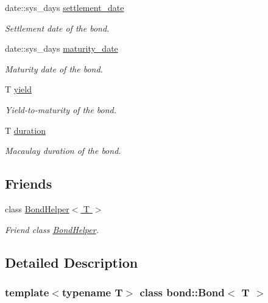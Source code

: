 \begin{DoxyCompactItemize}
date\+::sys\+\_\+days \hyperlink{classbond_1_1_bond_a2ead15c4c0cbda2cdecf6500b02442e7}{settlement\+\_\+date}
\begin{DoxyCompactList}\small\item\em Settlement date of the bond. \end{DoxyCompactList}\item 
date\+::sys\+\_\+days \hyperlink{classbond_1_1_bond_aba0bd9e2e1de7b9f05bb9c61b1fb9f1e}{maturity\+\_\+date}
\begin{DoxyCompactList}\small\item\em Maturity date of the bond. \end{DoxyCompactList}\item 
T \hyperlink{classbond_1_1_bond_ac79ec630d68f58775849145ab305d5f8}{yield}
\begin{DoxyCompactList}\small\item\em Yield-\/to-\/maturity of the bond. \end{DoxyCompactList}\item 
T \hyperlink{classbond_1_1_bond_a76d054bdd6dcdefa0147495f8ecdc852}{duration}
\begin{DoxyCompactList}\small\item\em Macaulay duration of the bond. \end{DoxyCompactList}\end{DoxyCompactItemize}
\subsection*{Friends}
\begin{DoxyCompactItemize}
\item 
class \hyperlink{classbond_1_1_bond_aa0950c8d07f76b3cb69c5655951e1386}{Bond\+Helper$<$ T $>$}
\begin{DoxyCompactList}\small\item\em Friend class \hyperlink{classbond_1_1_bond_helper}{Bond\+Helper}. \end{DoxyCompactList}\end{DoxyCompactItemize}


\subsection{Detailed Description}
\subsubsection*{template$<$typename T$>$\newline
class bond\+::\+Bond$<$ T $>$}

